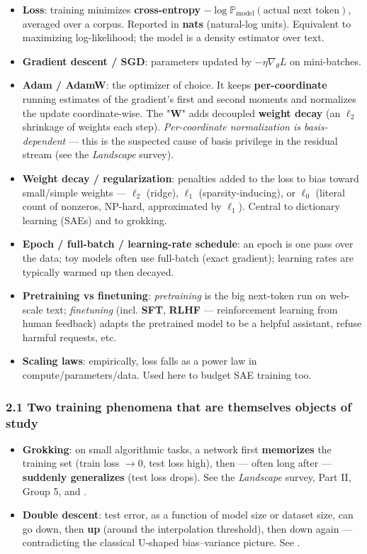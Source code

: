 \begin{itemize}
\item \textbf{Loss}: training minimizes \textbf{cross-entropy} $-\log \mathbb{P}_{\text{model}}(\text{actual next token})$, averaged over a corpus. Reported in \textbf{nats} (natural-log units). Equivalent to maximizing log-likelihood; the model is a density estimator over text.
\item \textbf{Gradient descent / SGD}: parameters updated by $-\eta \nabla_\theta L$ on mini-batches.
\item \textbf{Adam / AdamW}: the optimizer of choice. It keeps \textbf{per-coordinate} running estimates of the gradient's first and second moments and normalizes the update coordinate-wise. The "\textbf{W}" adds decoupled \textbf{weight decay} (an $\ell_2$ shrinkage of weights each step). \emph{Per-coordinate normalization is basis-dependent} --- this is the suspected cause of basis privilege in the residual stream (see the \emph{Landscape} survey).
\item \textbf{Weight decay / regularization}: penalties added to the loss to bias toward small/simple weights --- $\ell_2$ (ridge), $\ell_1$ (sparsity-inducing), or $\ell_0$ (literal count of nonzeros, NP-hard, approximated by $\ell_1$). Central to dictionary learning (SAEs) and to grokking.
\item \textbf{Epoch / full-batch / learning-rate schedule}: an epoch is one pass over the data; toy models often use full-batch (exact gradient); learning rates are typically warmed up then decayed.
\item \textbf{Pretraining vs finetuning}: \emph{pretraining} is the big next-token run on web-scale text; \emph{finetuning} (incl. \textbf{SFT}, \textbf{RLHF} --- reinforcement learning from human feedback) adapts the pretrained model to be a helpful assistant, refuse harmful requests, etc.
\item \textbf{Scaling laws}: empirically, loss falls as a power law in compute/parameters/data. Used here to budget SAE training too.
\end{itemize}

\subsubsection*{2.1 Two training phenomena that are themselves objects of study}
\begin{itemize}
\item \textbf{Grokking}: on small algorithmic tasks, a network first \textbf{memorizes} the training set (train loss $\to 0$, test loss high), then --- often long after --- \textbf{suddenly generalizes} (test loss drops). See the \emph{Landscape} survey, Part II, Group 5, and \textcite{progress-measures-for-grokking}.
\item \textbf{Double descent}: test error, as a function of model size or dataset size, can go down, then \textbf{up} (around the interpolation threshold), then down again --- contradicting the classical U-shaped bias--variance picture. See \textcite{superposition-memorization-double-descent}.
\end{itemize}


